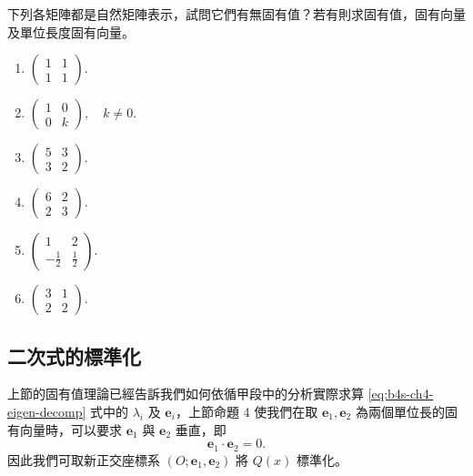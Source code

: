 下列各矩陣都是自然矩陣表示，試問它們有無固有值？若有則求固有值，固有向量及單位長度固有向量。

\begin{enumerate}
  \item $\begin{pmatrix} 1 & 1 \\ 1 & 1 \end{pmatrix}$.
  \item $\begin{pmatrix} 1 & 0 \\ 0 & k \end{pmatrix}, \quad k \ne 0$.
  \item $\begin{pmatrix} 5 & 3 \\ 3 & 2 \end{pmatrix}$.
  \item $\begin{pmatrix} 6 & 2 \\ 2 & 3 \end{pmatrix}$.
  \item $\begin{pmatrix} 1 & 2 \\ -\frac{1}{2} & \frac{1}{2} \end{pmatrix}$.
  \item $\begin{pmatrix} 3 & 1 \\ 2 & 2 \end{pmatrix}$.
\end{enumerate}


\subsection{二次式的標準化}\label{sec:b4s-4-3}

上節的固有值理論已經告訴我們如何依循甲段中的分析實際求算 \eqref{eq:b4s-ch4-eigen-decomp} 式中的 $\lambda_i$ 及 $\mathbf{e}_i$，上節命題 4 使我們在取 $\mathbf{e}_1, \mathbf{e}_2$ 為兩個單位長的固有向量時，可以要求 $\mathbf{e}_1$ 與 $\mathbf{e}_2$ 垂直，即
\[
\mathbf{e}_1 \cdot \mathbf{e}_2 = 0.
\]
因此我們可取新正交座標系 $(O; \mathbf{e}_1, \mathbf{e}_2)$ 將 $Q(x)$ 標準化。

